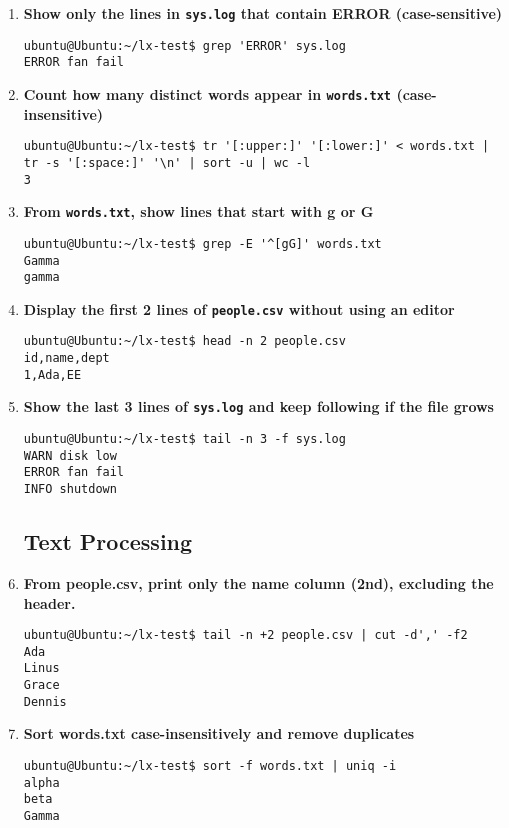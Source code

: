 \begin{enumerate}[leftmargin=2em]
  \item \textbf{Show only the lines in \texttt{sys.log} that contain ERROR (case-sensitive)}
\begin{Verbatim}[formatcom=\color{blue}]
ubuntu@Ubuntu:~/lx-test$ grep 'ERROR' sys.log
ERROR fan fail
\end{Verbatim}

  \item \textbf{Count how many distinct words appear in \texttt{words.txt} (case-insensitive)}
\begin{Verbatim}[formatcom=\color{blue}]
ubuntu@Ubuntu:~/lx-test$ tr '[:upper:]' '[:lower:]' < words.txt | tr -s '[:space:]' '\n' | sort -u | wc -l
3
\end{Verbatim}

  \item \textbf{From \texttt{words.txt}, show lines that start with g or G}
\begin{Verbatim}[formatcom=\color{blue}]
ubuntu@Ubuntu:~/lx-test$ grep -E '^[gG]' words.txt
Gamma
gamma
\end{Verbatim}

  \item \textbf{Display the first 2 lines of \texttt{people.csv} without using an editor}
\begin{Verbatim}[formatcom=\color{blue}]
ubuntu@Ubuntu:~/lx-test$ head -n 2 people.csv
id,name,dept
1,Ada,EE
\end{Verbatim}

  \item \textbf{Show the last 3 lines of \texttt{sys.log} and keep following if the file grows}
\begin{Verbatim}[formatcom=\color{blue}]
ubuntu@Ubuntu:~/lx-test$ tail -n 3 -f sys.log
WARN disk low
ERROR fan fail
INFO shutdown
\end{Verbatim}
\subsection{Text Processing}
  \item \textbf{From people.csv, print only the name column (2nd), excluding the header.}
\begin{Verbatim}[formatcom=\color{blue}]
ubuntu@Ubuntu:~/lx-test$ tail -n +2 people.csv | cut -d',' -f2
Ada
Linus
Grace
Dennis
\end{Verbatim}

  \item \textbf{Sort words.txt case-insensitively and remove duplicates}
\begin{Verbatim}[formatcom=\color{blue}]
ubuntu@Ubuntu:~/lx-test$ sort -f words.txt | uniq -i
alpha
beta
Gamma
\end{Verbatim}


\end{enumerate}
